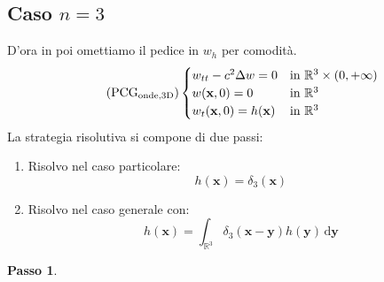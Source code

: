 \documentclass[10pt,a4paper,twoside,openright]{book}
\newcommand{\x}{\mathbf{x}}
\newcommand{\y}{\mathbf{y}}
\newcommand{\de}{\,\mathrm d}
\newcommand{\dyy}{\de \y}
\begin{document}
\subsection{Caso \texorpdfstring{$n=3$}{n=3}}

D'ora in poi omettiamo il pedice in $\displaystyle w_{h}$ per comodità.
\begin{equation*}
    \tag{PCG$_{\text{onde,3D}}$}
    \begin{cases}
        w_{tt} -c^{2} \Delta w=0 & \text{in} \ \mathbb{R}^{3} \times (0,+\infty) \\
        w(\x ,0) =0              & \text{in} \ \mathbb{R}^{3}                    \\
        w_{t}(\x ,0) =h(\x)      & \text{in} \ \mathbb{R}^{3}
    \end{cases}
    \label{eq:pcg-onde-3d}
\end{equation*}
La strategia risolutiva si compone di due passi:
\begin{enumerate}
    \item Risolvo nel caso particolare:
          \begin{equation*}
              h(\x) =\delta _{3}(\x)
          \end{equation*}
    \item Risolvo nel caso generale con:
          \begin{equation*}
              h(\x) =\int _{\mathbb{R}^{3}} \delta _{3}(\x -\y) h(\y) \dyy
          \end{equation*}
\end{enumerate}

\textbf{Passo 1}.
\end{document}
